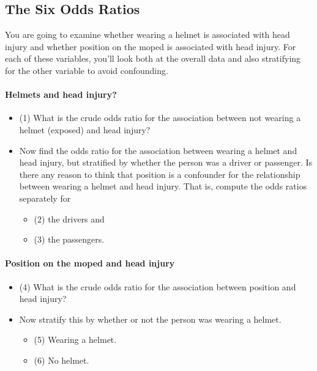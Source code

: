 \documentclass{article}
\begin{document}
\begin{multicols}{2}
\subsection*{The Six Odds Ratios}

You are going to examine whether wearing a helmet is associated with
head injury and whether position on the moped is associated with head
injury.  For each of these variables, you'll look both at the overall
data and also stratifying for the other variable to avoid confounding.


\paragraph{Helmets and head injury?}
 
\begin{itemize}
\item (1) What is the crude odds ratio for the association between not wearing a helmet (exposed) and head injury? 
\item Now find the odds ratio for the association between wearing a helmet and head injury, but stratified by whether the person was a driver or passenger.  Is there any reason to think that position is a confounder for the relationship between wearing a helmet and head injury.  That is, compute the odds ratios separately for 
\begin{itemize}
\item (2) the drivers and 
\item (3) the passengers.
\end{itemize}
\end{itemize}


\paragraph{Position on the moped and head injury}

\begin{itemize}
\item (4) What is the crude odds ratio for the association between position and head injury?
\item Now stratify this by whether or not the person was wearing a helmet. 
\begin{itemize}
\item (5) Wearing a helmet.
\item (6) No helmet.
\end{itemize}
\end{itemize}


\end{multicols}
\end{document}
